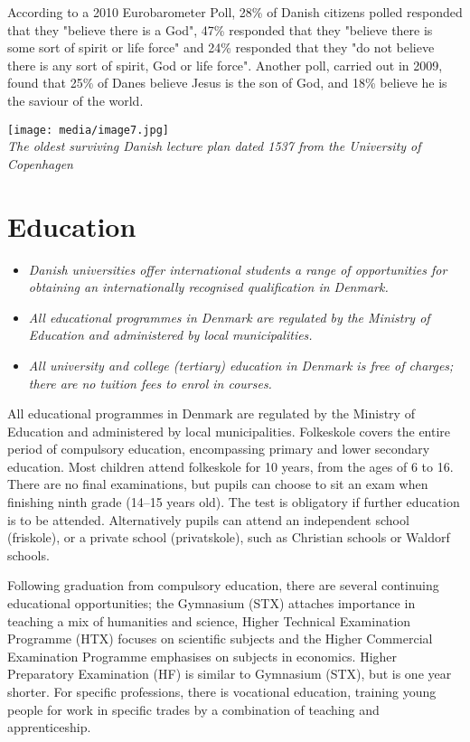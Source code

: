 According to a 2010 Eurobarometer Poll, 28\% of Danish citizens polled
responded that they "believe there is a God", 47\% responded that they
"believe there is some sort of spirit or life force" and 24\% responded
that they "do not believe there is any sort of spirit, God or life
force". Another poll, carried out in 2009, found that 25\% of Danes
believe Jesus is the son of God, and 18\% believe he is the saviour of
the world.

\texttt{[image: media/image7.jpg]}\\
\emph{The oldest surviving Danish lecture plan dated 1537 from the
University of Copenhagen}

\section{Education}\label{education}

\begin{itemize}
\item
  \emph{Danish universities offer international students a range of
  opportunities for obtaining an internationally recognised
  qualification in Denmark.}
\item
  \emph{All educational programmes in Denmark are regulated by the
  Ministry of Education and administered by local municipalities.}
\item
  \emph{All university and college (tertiary) education in Denmark is
  free of charges; there are no tuition fees to enrol in courses.}
\end{itemize}

All educational programmes in Denmark are regulated by the Ministry of
Education and administered by local municipalities. Folkeskole covers
the entire period of compulsory education, encompassing primary and
lower secondary education. Most children attend folkeskole for 10 years,
from the ages of 6 to 16. There are no final examinations, but pupils
can choose to sit an exam when finishing ninth grade (14--15 years old).
The test is obligatory if further education is to be attended.
Alternatively pupils can attend an independent school (friskole), or a
private school (privatskole), such as Christian schools or Waldorf
schools.

Following graduation from compulsory education, there are several
continuing educational opportunities; the Gymnasium (STX) attaches
importance in teaching a mix of humanities and science, Higher Technical
Examination Programme (HTX) focuses on scientific subjects and the
Higher Commercial Examination Programme emphasises on subjects in
economics. Higher Preparatory Examination (HF) is similar to Gymnasium
(STX), but is one year shorter. For specific professions, there is
vocational education, training young people for work in specific trades
by a combination of teaching and apprenticeship.

